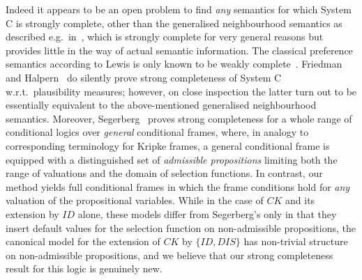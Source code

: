 \documentclass[proceedings]{stacs}
\theoremstyle{definition}
\theoremstyle{plain}
\newcommand{\mi}[1]{\mathit{#1}}
\newcommand{\CK}{\mathit{CK}}
\begin{document}
\begin{exa}
  Indeed it appears to be an open problem to find \emph{any} semantics
  for which System C is strongly complete, other than the generalised
  neighbourhood semantics as described e.g.\
  in~\cite{SchroderPattinson07mcs}, which is strongly complete for
  very general reasons but provides little in the way of actual
  semantic information. The classical preference semantics according
  to Lewis is only known to be weakly
  complete~\cite{Burgess81}. Friedman and
  Halpern~\cite{FriedmanHalpern01} do silently prove strong
  completeness of System C w.r.t.\ plausibility measures; however, on
  close inspection the latter turn out to be essentially equivalent to
  the above-mentioned generalised neighbourhood semantics. Moreover,
  Segerberg~\cite{Segerberg89} proves strong completeness for a whole
  range of conditional logics over \emph{general} conditional frames,
  where, in analogy to corresponding terminology for Kripke frames, a
  general conditional frame is equipped with a distinguished set of
  \emph{admissible propositions} limiting both the range of valuations
  and the domain of selection functions. In contrast, our method
  yields full conditional frames in which the frame conditions hold
  for \emph{any} valuation of the propositional variables. While in
  the case of $\CK$ and its extension by $\mi{ID}$ alone, these models
  differ from Segerberg's only in that they insert default values for
  the selection function on non-admissible propositions, the
  canonical model for the extension of $\CK$ by $\{\mi{ID},\mi{DIS}\}$
  has non-trivial structure on non-admissible propositions, and we
  believe that our strong completeness result for this logic is
  genuinely new.
\end{exa}
\end{document}

